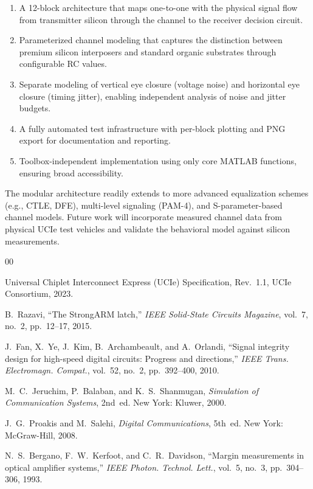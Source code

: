 \documentclass[conference]{IEEEtran}
\begin{document}
\begin{enumerate}
    \item A 12-block architecture that maps one-to-one with the physical signal flow from transmitter silicon through the channel to the receiver decision circuit.
    
    \item Parameterized channel modeling that captures the distinction between premium silicon interposers and standard organic substrates through configurable RC values.
    
    \item Separate modeling of vertical eye closure (voltage noise) and horizontal eye closure (timing jitter), enabling independent analysis of noise and jitter budgets.
    
    \item A fully automated test infrastructure with per-block plotting and PNG export for documentation and reporting.
    
    \item Toolbox-independent implementation using only core MATLAB functions, ensuring broad accessibility.
\end{enumerate}

The modular architecture readily extends to more advanced equalization schemes (e.g., CTLE, DFE), multi-level signaling (PAM-4), and S-parameter-based channel models. Future work will incorporate measured channel data from physical UCIe test vehicles and validate the behavioral model against silicon measurements.

\begin{thebibliography}{00}

 Universal Chiplet Interconnect Express (UCIe) Specification, Rev.~1.1, UCIe Consortium, 2023.

 B.~Razavi, ``The StrongARM latch,'' \textit{IEEE Solid-State Circuits Magazine}, vol.~7, no.~2, pp.~12--17, 2015.

 J.~Fan, X.~Ye, J.~Kim, B.~Archambeault, and A.~Orlandi, ``Signal integrity design for high-speed digital circuits: Progress and directions,'' \textit{IEEE Trans. Electromagn. Compat.}, vol.~52, no.~2, pp.~392--400, 2010.

 M.~C.~Jeruchim, P.~Balaban, and K.~S.~Shanmugan, \textit{Simulation of Communication Systems}, 2nd~ed. New York: Kluwer, 2000.

 J.~G.~Proakis and M.~Salehi, \textit{Digital Communications}, 5th~ed. New York: McGraw-Hill, 2008.

 N.~S.~Bergano, F.~W.~Kerfoot, and C.~R.~Davidson, ``Margin measurements in optical amplifier systems,'' \textit{IEEE Photon. Technol. Lett.}, vol.~5, no.~3, pp.~304--306, 1993.

\end{thebibliography}
\end{document}
